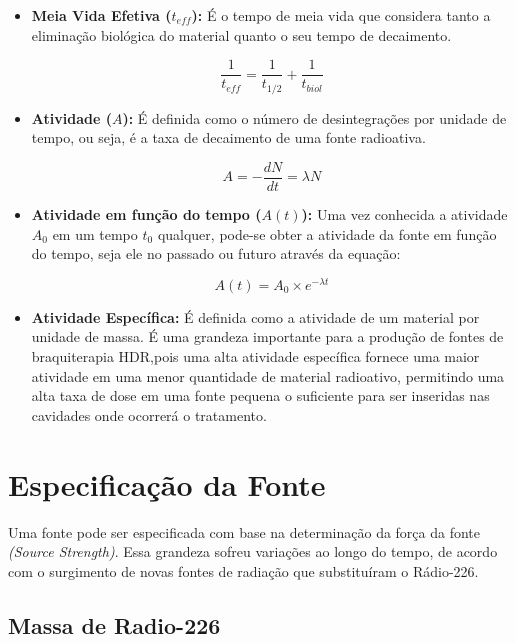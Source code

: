 \documentclass[11pt,a4paper]{article}
\begin{document}
\begin{itemize}
			\item \textbf{Meia Vida Efetiva ($t_{eff}$): } É o tempo de meia vida que considera tanto a eliminação biológica do material quanto o seu tempo de decaimento.
			
				\begin{equation}
					\frac{1}{t_{eff}} = \frac{1}{t_{1/2}} + \frac{1}{t_{biol}}
				\end{equation}

			\item \textbf{Atividade ($A$): } É definida como o número de desintegrações por unidade de tempo, ou seja, é a taxa de decaimento de uma fonte radioativa. 
				
				\begin{equation}
					A = -\frac{dN}{dt} = \lambda N
				\end{equation}

			\item \textbf{Atividade em função do tempo ($A(t)$): } Uma vez conhecida a atividade $A_0$ em um tempo $t_0$ qualquer, pode-se obter a atividade da fonte em função do tempo, seja ele no passado ou futuro através da equação:
				
				\begin{equation}
					A(t) = A_0 \times e^{-\lambda t}
					\label{eq:AtividadeNoTempo}
				\end{equation}

			\item \textbf{Atividade Específica: } É definida como a atividade de um material por unidade de massa. É uma grandeza importante para a produção de fontes de braquiterapia HDR,pois uma alta atividade específica fornece uma maior atividade em uma menor quantidade de material radioativo, permitindo uma alta taxa de dose em uma fonte pequena o suficiente para ser inseridas nas cavidades onde ocorrerá o tratamento.

		\end{itemize}

	\section{Especificação da Fonte}
		
		Uma fonte pode ser especificada com base na determinação da força da fonte \textit{(Source Strength)}. Essa grandeza sofreu variações ao longo do tempo, de acordo com o surgimento de novas fontes de radiação que substituíram o Rádio-226. 

		\subsection{Massa de Radio-226}
\end{document}
